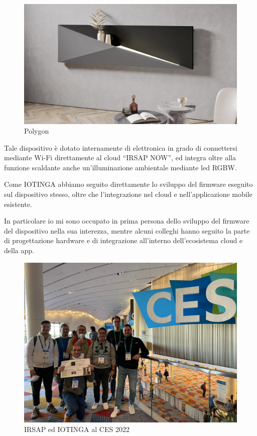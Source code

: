 \documentclass[a4paper,titlepage]{article}
\begin{document}
\begin{figure}[h]
    \centering
    \includegraphics[width=12cm]{img/polygon.jpeg}
    \caption{Polygon}
    \label{polygon}
\end{figure}

Tale dispositivo è dotato internamente di elettronica in grado di connettersi mediante
Wi-Fi direttamente al cloud ``IRSAP NOW'', ed integra oltre alla funzione scaldante
anche un'illuminazione ambientale mediante led RGBW.

Come IOTINGA abbiamo seguito direttamente lo sviluppo del firmware eseguito sul
dispositivo stesso, oltre che l'integrazione nel cloud e nell'applicazione mobile esistente.

In particolare io mi sono occupato in prima persona dello sviluppo del firmware
del dispositivo nella sua interezza, mentre alcuni colleghi hanno seguito la parte
di progettazione hardware e di integrazione all'interno dell'ecosistema cloud e della app.

\begin{figure}[h]
    \centering
    \includegraphics[width=12cm]{img/ces.jpeg}
    \caption{IRSAP ed IOTINGA al CES 2022}
    \label{ces}
\end{figure}
\end{document}

